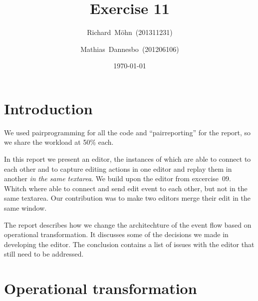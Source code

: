 \documentclass[a4paper,draft,12pt,oneside,article,table]{memoir}
\newcommand{\supertitle}[1]{\gdef\suP{#1}}
\newcommand{\subtitle}[1]{\gdef\suB{#1}}
\newcommand{\stunum}[1]{\gdef\stuN{#1}}
\begin{document}
\supertitle{Distributed Systems}
\title{Exercise 11}
\author{Richard~Möhn~\small{(201311231)} \and Mathias~Dannesbo~\small{(201206106)}}
\date{\today}
\maketitle

\chapter{Introduction}
We used pairprogramming for all the code and ``pairreporting'' for the
report, so we share the workload at 50\% each.

In this report we present an editor, the instances of which are able
to connect to each other and to capture editing actions in one editor
and replay them in another \textit{in the same textarea}.  We build
upon the editor from excercise~09. Whitch where able to connect and
send edit event to each other, but not in the same textarea. Our contribution was to
make two editors merge their edit in the same window.

The report describes how we change the architechture of the event flow
based on operational transformation. It discusses some of the
decisions we made in developing the editor. The conclusion contains a
list of issues with the editor that still need to be addressed.

\chapter{Operational transformation}

\end{document}
